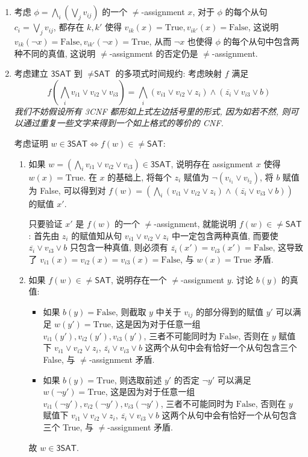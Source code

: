 \documentclass[8pt]{article}
\theoremstyle{compact}
\begin{document}
\section{}
\begin{enumerate}
	\item 考虑 $\phi = \bigwedge_i\left(\bigvee_j v_{ij}\right)$ 的一个 $\neq$-assignment $x$, 对于 $\phi$ 的每个从句 $c_i = \bigvee_j v_{ij}$, 都存在 $k, k'$ 使得 $v_{ik}(x) = \text{True}, v_{ik'}(x) = \text{False}$, 这说明 $v_{ik}(\lnot x) = \text{False}, v_{ik'}(\lnot x) = \text{True}$, 从而 $\lnot x$ 也使得 $\phi$ 的每个从句中包含两种不同的真值, 这说明 $\neq$-assignment 的否定仍是 $\neq$-assignment.
	\item 考虑建立 $\textsf{3SAT}$ 到 $\neq\textsf{SAT}$ 的多项式时间规约: 考虑映射 $f$ 满足 $$f\left(\bigwedge_i v_{i1} \vee v_{i2} \vee v_{i3}\right) = \bigwedge_i(v_{i1} \vee v_{i2} \vee{z_i}) \wedge (\overline{z_i} \vee v_{i3} \vee b)$$
	\textit{我们不妨假设所有 3CNF 都形如上式左边括号里的形式, 因为如若不然, 则可以通过重复一些文字来得到一个如上格式的等价的 CNF.}

	考虑证明 $w \in \textsf{3SAT} \Leftrightarrow f(w) \in \neq\textsf{SAT}$:
	\begin{enumerate}
		\item 如果 $w = \left(\bigwedge_i v_{i1} \vee v_{i2} \vee v_{i3} \right) \in \textsf{3SAT}$, 说明存在 assignment $x$ 使得 $w(x) = \text{True}$. 在 $x$ 的基础上, 将每个 $z_i$ 赋值为 $\lnot \left(v_{i_1} \vee v_{i_2}\right)$, 将 $b$ 赋值为 False, 可以得到对 $f(w) = \left(\bigwedge_i(v_{i1} \vee v_{i2} \vee{z_i}) \wedge (\overline{z_i} \vee v_{i3} \vee b)\right)$ 的赋值 $x'$. 
		
		只要验证 $x'$ 是 $f(w)$ 的一个 $\neq$-assignment, 就能说明 $f(w) \in \neq\textsf{SAT}$: 首先由 $z_i$ 的赋值知从句 $v_{i1} \vee v_{i2} \vee{z_i}$ 中一定包含两种真值, 而要使 $\overline{z_i} \vee v_{i3} \vee b$ 只包含一种真值, 则必须有 $\overline{z_i}(x') = v_{i3}(x') = \text{False}$, 这导致了 $v_{i1}(x) = v_{i2}(x) = v_{i3}(x) = \text{False}$, 与 $w(x) = \text{True}$ 矛盾.

		\item 如果 $f(w) \in \neq\textsf{SAT}$, 说明存在一个 $\neq$-assignment $y$. 讨论 $b(y)$ 的真值:
		\begin{itemize}
			\item 如果 $b(y) = \text{False}$, 则截取 $y$ 中关于 $v_{ij}$ 的部分得到的赋值 $y'$ 可以满足 $w(y') = \text{True}$, 这是因为对于任意一组 $v_{i1}(y'), v_{i2}(y'), v_{i3}(y')$, 三者不可能同时为 $\text{False}$, 否则在 $y$ 赋值下 $v_{i1} \vee v_{i2} \vee{z_i}$, $\overline{z_i} \vee v_{i3} \vee b$ 这两个从句中会有恰好一个从句包含三个 False, 与 $\neq$-assignment 矛盾.
			\item 如果 $b(y) = \text{True}$, 则选取前述 $y'$ 的否定 $\lnot y'$ 可以满足 $w(\lnot y') = \text{True}$, 这是因为对于任意一组 $v_{i1}(\lnot y'), v_{i2}(\lnot y'), v_{i3}(\lnot y')$, 三者不可能同时为 $\text{False}$, 否则在 $y$ 赋值下 $v_{i1} \vee v_{i2} \vee{z_i}$, $\overline{z_i} \vee v_{i3} \vee b$ 这两个从句中会有恰好一个从句包含三个 True, 与 $\neq$-assignment 矛盾.
		\end{itemize}
		故 $w \in \textsf{3SAT}$.
		

\end{enumerate}
\end{enumerate}
\end{document}
